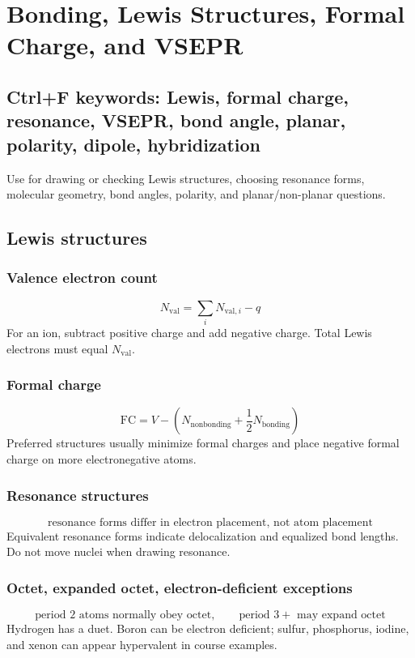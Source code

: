 \section{Bonding, Lewis Structures, Formal Charge, and VSEPR}

\subsection{Ctrl+F keywords: Lewis, formal charge, resonance, VSEPR, bond angle, planar, polarity, dipole, hybridization}
Use for drawing or checking Lewis structures, choosing resonance forms, molecular geometry, bond angles, polarity, and planar/non-planar questions.

\subsection{Lewis structures}

\subsubsection{Valence electron count}
\[
N_{\mathrm{val}}=\sum_i N_{\mathrm{val},i}-q
\]
For an ion, subtract positive charge and add negative charge. Total Lewis electrons must equal \(N_{\mathrm{val}}\).

\subsubsection{Formal charge}
\[
\mathrm{FC}=V-\left(N_{\mathrm{nonbonding}}+\frac12N_{\mathrm{bonding}}\right)
\]
Preferred structures usually minimize formal charges and place negative formal charge on more electronegative atoms.

\subsubsection{Resonance structures}
\[
\text{resonance forms differ in electron placement, not atom placement}
\]
Equivalent resonance forms indicate delocalization and equalized bond lengths. Do not move nuclei when drawing resonance.

\subsubsection{Octet, expanded octet, electron-deficient exceptions}
\[
\text{period 2 atoms normally obey octet}, \qquad
\text{period }3+\text{ may expand octet}
\]
Hydrogen has a duet. Boron can be electron deficient; sulfur, phosphorus, iodine, and xenon can appear hypervalent in course examples.

